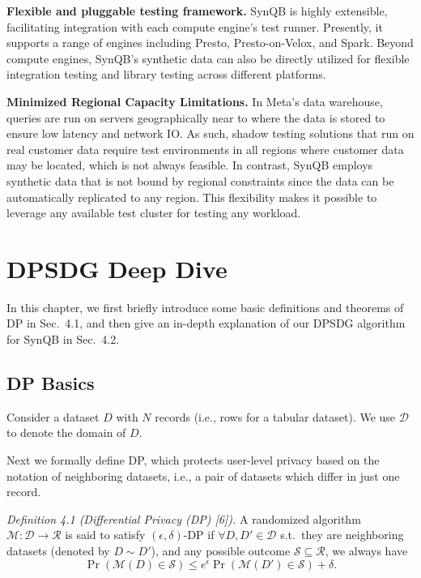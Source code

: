 \documentclass[11pt]{article}
\begin{document}
\textbf{Flexible and pluggable testing framework.} SynQB is highly
extensible, facilitating integration with each compute engine's test
runner. Presently, it supports a range of engines including Presto,
Presto-on-Velox, and Spark. Beyond compute engines, SynQB's
synthetic data can also be directly utilized for flexible integration
testing and library testing across different platforms.

\textbf{Minimized Regional Capacity Limitations.} In Meta's data
warehouse, queries are run on servers geographically near to where
the data is stored to ensure low latency and network IO. As such,
shadow testing solutions that run on real customer data require test
environments in all regions where customer data may be located,
which is not always feasible. In contrast, SynQB employs synthetic
data that is not bound by regional constraints since the data can
be automatically replicated to any region. This flexibility makes
it possible to leverage any available test cluster for testing any
workload.

\section{DPSDG Deep Dive}
In this chapter, we first briefly introduce some basic definitions and
theorems of DP in Sec.~4.1, and then give an in-depth explanation
of our DPSDG algorithm for SynQB in Sec.~4.2.

\subsection{DP Basics}
Consider a dataset $D$ with $N$ records (i.e., rows for a tabular dataset).
We use $\mathcal{D}$ to denote the domain of $D$.

Next we formally define DP, which protects user-level privacy
based on the notation of neighboring datasets, i.e., a pair of datasets
which differ in just one record.

\textit{Definition 4.1 (Differential Privacy (DP) [6]).} A randomized algorithm
$\mathcal{M} : \mathcal{D} \to \mathcal{R}$ is said to satisfy $(\epsilon,\delta)$-DP if
$\forall D, D' \in \mathcal{D}$ s.t.\ they are neighboring datasets (denoted by
$D \sim D'$), and any possible outcome $\mathcal{S} \subseteq \mathcal{R}$, we always have
\begin{equation}
\Pr(\mathcal{M}(D) \in \mathcal{S}) \leq e^{\epsilon}\Pr(\mathcal{M}(D') \in \mathcal{S}) + \delta.
\end{equation}
\end{document}
